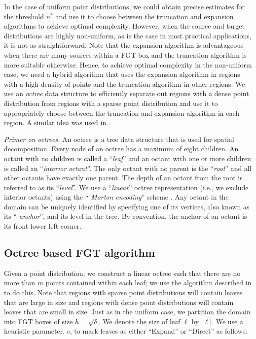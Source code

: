 
 In the case of uniform point distributions, we could obtain precise estimates for the threshold $n^*$ and use it to 
 choose between the truncation and expansion algorithms to achieve optimal complexity. However, when the source and 
 target distributions are highly non-uniform, as is the case in most practical applications, it is not as
 straightforward. Note that the expansion algorithm is advantageous when there are many sources within a FGT box and
 the truncation algorithm is more suitable otherwise. Hence, to achieve optimal complexity in the non-uniform case, we 
 need a hybrid algorithm that uses the expansion algorithm in regions with a high density of points and the 
 truncation algorithm in other regions. We use an {\em octree} \cite{clr90} data structure to efficiently
 separate out regions with a dense point distribution from regions with a sparse point distribution and use
 it to appropriately choose between the truncation and expansion algorithm in each region. A similar idea was
 used in \cite{veerapaneni08}.  
 
{\em Primer on octrees.} An octree is a tree data structure that is used for spatial decomposition. Every
node of an octree has a maximum of eight children. An octant with no children is
called a ``{\em leaf}'' and an octant with one or more children is
called an ``{\em interior octant}''. The only octant with no parent is the
 ``{\em root}'' and all other octants have exactly one parent. The depth of an octant 
 from the root is referred to as its ``{\em level}''. We use a ``{\em linear}'' octree
representation (i.e., we exclude interior octants) using the ``{\em
Morton encoding}'' scheme \cite{morton66}. Any octant in the domain can be uniquely
identified by specifying one of its vertices, also known as its ``{\em
anchor}'', and its level in the tree. By convention, the anchor of an
octant is its front lower left corner. 

\subsection{Octree based FGT algorithm}
\label{sc:octreefgt}

 Given a point distribution, we construct a linear octree such that there are no more than $m$ points contained within each leaf; we
 use the algorithm described in \cite{octPaper08} to do this. Note that regions with sparse point distributions will contain 
 leaves that are large in size and regions with dense point distributions will contain leaves that are small in size. Just as in 
 the uniform case, we partition the domain into FGT boxes of size $h = \sqrt{\delta}$. We denote the size of leaf $\ell$ by $|\ell|$.
 We use a heuristic parameter, $c$, to mark leaves as either ``Expand'' or ``Direct'' as follows:

